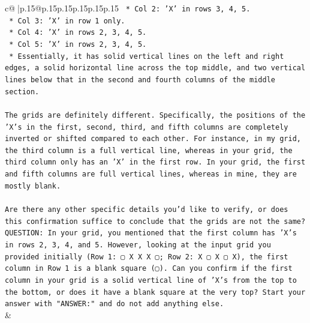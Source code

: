\documentclass{article}
\begin{document}
{\begin{supertabular}{c@{$\;$}|p{.15\linewidth}@{}p{.15\linewidth}p{.15\linewidth}p{.15\linewidth}p{.15\linewidth}p{.15\linewidth}}
{{{\texttt{    *   Col 2: 'X' in rows 3, 4, 5.} \\
\texttt{    *   Col 3: 'X' in row 1 only.} \\
\texttt{    *   Col 4: 'X' in rows 2, 3, 4, 5.} \\
\texttt{    *   Col 5: 'X' in rows 2, 3, 4, 5.} \\
\texttt{    *   Essentially, it has solid vertical lines on the left and right edges, a solid horizontal line across the top middle, and two vertical lines below that in the second and fourth columns of the middle section.} \\
\\ 
\texttt{The grids are definitely different. Specifically, the positions of the 'X's in the first, second, third, and fifth columns are completely inverted or shifted compared to each other. For instance, in my grid, the third column is a full vertical line, whereas in your grid, the third column only has an 'X' in the first row. In your grid, the first and fifth columns are full vertical lines, whereas in mine, they are mostly blank.} \\
\\ 
\texttt{Are there any other specific details you'd like to verify, or does this confirmation suffice to conclude that the grids are not the same?} \\
\texttt{QUESTION: In your grid, you mentioned that the first column has 'X's in rows 2, 3, 4, and 5. However, looking at the input grid you provided initially (Row 1: ▢ X X X ▢; Row 2: X ▢ X ▢ X), the first column in Row 1 is a blank square (▢). Can you confirm if the first column in your grid is a solid vertical line of 'X's from the top to the bottom, or does it have a blank square at the very top? Start your answer with "ANSWER:" and do not add anything else.} \\
            }
        }
    }
    & \\ \\


\end{supertabular}}
\end{document}
